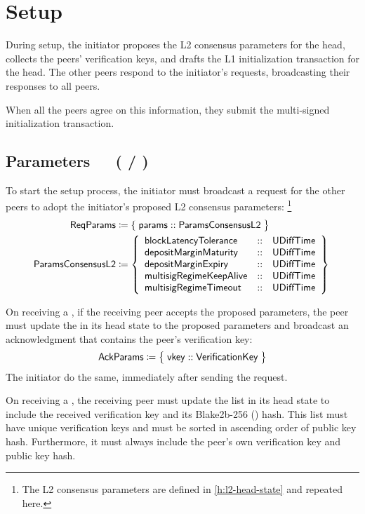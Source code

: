 \documentclass[../hydrozoa.tex]{subfiles}
\begin{document}
\section{Setup}%
\label{h:l2-consensus-setup}%

During setup, the initiator proposes the L2 consensus parameters for the head, collects the peers' verification keys, and drafts the L1 initialization transaction for the head.
The other peers respond to the initiator's requests, broadcasting their responses to all peers.

When all the peers agree on this information, they submit the multi-signed initialization transaction.

\subsection{Parameters~~~( / )}%
\label{h:l2-consensus-parameters}%

To start the setup process, the initiator must broadcast a request for the other peers to adopt the initiator's proposed L2 consensus parameters:%
\footnote{The L2 consensus parameters are defined in \cref{h:l2-head-state} and repeated here.}
\begin{equation*}
\begin{split}
  \T{ReqParams} &\coloneq \{\; \T{params} :: \paramsConsensusTypeName{} \;\bigr\} \\
  \paramsConsensusTypeName{} &\coloneq \paramsConsensusTypeBody{}
\end{split}
\end{equation*}

On receiving a , if the receiving peer accepts the proposed parameters, the peer must update the  in its head state to the proposed parameters and broadcast an acknowledgment that contains the peer's verification key:
\begin{equation*}
  \mathsf{AckParams} \coloneq \;\bigr\{\; \mathsf{vkey} :: \mathsf{VerificationKey} \;\bigr\}
\end{equation*}
The initiator do the same, immediately after sending the  request.

On receiving a , the receiving peer must update the  list in its head state to include the received verification key and its Blake2b-256 () hash.
This list must have unique verification keys and must be sorted in ascending order of public key hash.
Furthermore, it must always include the peer's own verification key and public key hash.
\end{document}
